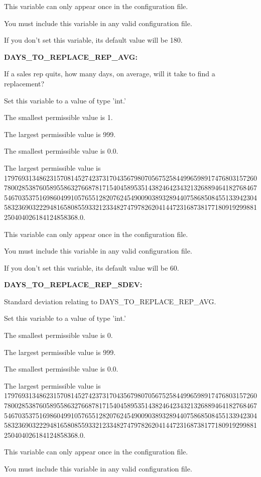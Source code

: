 This variable can only appear once in the configuration file.

You must include  this variable in any valid configuration file.

If you don't set this variable, its default value will be 180.


\textbf{DAYS\_TO\_REPLACE\_REP\_AVG:}


If a sales rep quits, how many days, on average, will it take to find a replacement?

Set this variable to a value of type 'int.'

The smallest permissible value is 1.

The largest permissible value is 999.

The smallest permissible value is 0.0.

The largest permissible value is 179769313486231570814527423731704356798070567525844996598917476803157260780028538760589558632766878171540458953514382464234321326889464182768467546703537516986049910576551282076245490090389328944075868508455133942304583236903222948165808559332123348274797826204144723168738177180919299881250404026184124858368.0.

This variable can only appear once in the configuration file.

You must include  this variable in any valid configuration file.

If you don't set this variable, its default value will be 60.


\textbf{DAYS\_TO\_REPLACE\_REP\_SDEV:}


Standard deviation relating to DAYS\_TO\_REPLACE\_REP\_AVG.

Set this variable to a value of type 'int.'

The smallest permissible value is 0.

The largest permissible value is 999.

The smallest permissible value is 0.0.

The largest permissible value is 179769313486231570814527423731704356798070567525844996598917476803157260780028538760589558632766878171540458953514382464234321326889464182768467546703537516986049910576551282076245490090389328944075868508455133942304583236903222948165808559332123348274797826204144723168738177180919299881250404026184124858368.0.

This variable can only appear once in the configuration file.

You must include  this variable in any valid configuration file.

